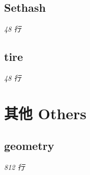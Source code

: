 \documentclass[12pt, UTF8]{ctexart}
\begin{document}
\subsection{Sethash}\hfill\normalsize\textit{48 行}



\subsection{tire}\hfill\normalsize\textit{48 行}



\section{其他 Others}

\subsection{geometry}\hfill\normalsize\textit{812 行}


\end{document}
